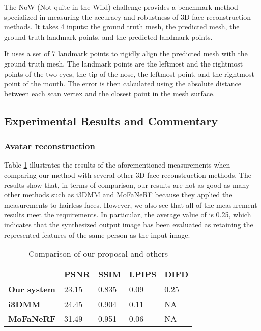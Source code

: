 The NoW (Not quite in-the-Wild) challenge \cite{RingNet:CVPR:2019} provides a benchmark method specialized in measuring the accuracy and robustness of 3D face reconstruction methods. It takes 4 inputs: the ground truth mesh, the predicted mesh, the ground truth landmark points, and the predicted landmark points.

It uses a set of 7 landmark points to rigidly align the predicted mesh with the ground truth mesh. The landmark points are the leftmost and the rightmost points of the two eyes, the tip of the nose, the leftmost point, and the rightmost point of the mouth. The error is then calculated using the absolute distance between each scan vertex and the closest point in the mesh surface.


\subsection{Experimental Results and Commentary}
\subsubsection{Avatar reconstruction}

Table \ref{loss_stats} illustrates the results of the aforementioned measurements when comparing our method with several other 3D face reconstruction methods. The results show that, in terms of comparison, our results are not as good as many other methods such as i3DMM and MoFaNeRF because they applied the measurements to hairless faces. However, we also see that all of the measurement results meet the requirements. In particular, the average value of  is 0.25, which indicates that the synthesized output image has been evaluated as retaining the represented features of the same person as the input image.

\begin{table}[H]
    \centering
    \captionsetup{font=bf}
    \caption{Comparison of our proposal and others}
    \begin{tabularx}{\linewidth}{| X | X | X | X | X |}
        \hline
                            & \textbf{PSNR} & \textbf{SSIM} & \textbf{LPIPS} & \textbf{DIFD} \\ \hline\hline
        \textbf{Our system} & 23.15         & 0.835         & 0.09           & 0.25          \\ \hline %
        \textbf{i3DMM}      & 24.45         & 0.904         & 0.11           & NA            \\ \hline
        \textbf{MoFaNeRF}   & 31.49         & 0.951         & 0.06           & NA            \\ \hline
    \end{tabularx}
    \label{loss_stats}
\end{table}

